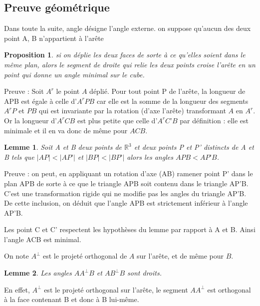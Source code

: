 \documentclass{article}
\newtheorem{prop}{Proposition}
\newtheorem{lem}{Lemme}
\begin{document}

\subsection{Preuve géométrique}

Dans toute la suite, angle désigne l’angle externe. on suppose qu'aucun des deux point A, B n'appartient à l'arête

\begin{prop}
si on déplie les deux faces de sorte à ce qu’elles soient dans le même plan, alors le segment de droite qui relie les deux points croise l’arête en un point qui donne un angle minimal sur le cube.
\end{prop}
Preuve : 
Soit $A^r$ le point $A$ déplié. Pour tout point P de l’arête, la longueur de APB est égale à celle d’$A^rPB$ car elle est la somme de la longueur des segments $A^rP$ et $PB$ qui est invariante par la rotation (d’axe l’arête) transformant $A$ en $A^r$. Or la longueur d’$A^rCB$ est plus petite que celle d’$A^rC’B$ par définition : elle est minimale et il en va donc de même pour $ACB.$


\begin{lem}
Soit A et B deux points de $\mathbb{R}^3$ et deux points P et P’ distincts de A et B tels que $|AP|<|AP’|$ et $|BP|<|BP’|$ alors les angles $APB<AP’B$.
\end{lem}
Preuve : on peut, en appliquant un rotation d’axe (AB) ramener point P’ dans le plan APB de sorte à ce que le triangle APB soit contenu dans le triangle AP’B. C’est une transformation rigide qui ne modifie pas les angles du triangle AP’B. De cette inclusion, on déduit que l’angle APB est strictement inférieur à l’angle AP’B.  

Les point C et C’ respectent les hypothèses du lemme par rapport à A et B. Ainsi l’angle ACB est minimal. 

On note $A^\perp$ est le projeté orthogonal de $A$ sur l’arête, et de même pour $B$.
\begin{lem}
Les angles  $AA^\perp B$ et $AB^\perp B$ sont droits.
\end{lem}
En effet, $A^\perp$ est le projeté orthogonal sur l’arête, le segment $AA^\perp$ est orthogonal à la face contenant B et donc à B lui-même. 
\end{document}
